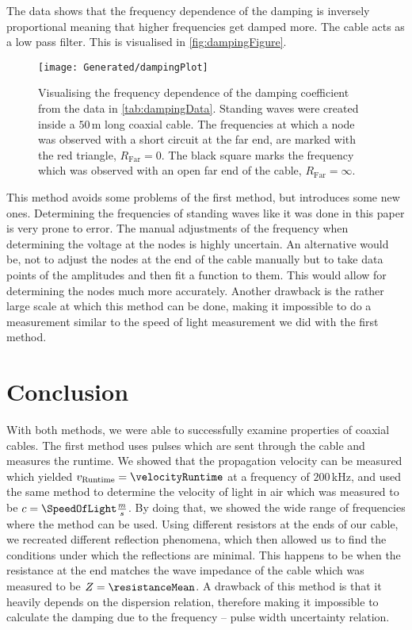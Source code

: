 \documentclass[a4paper,10pt,twocolumn]{article}
\begin{document}
    The data shows that the frequency dependence of the damping is inversely proportional meaning that higher frequencies get damped more.
    The cable acts as a low pass filter.
    This is visualised in \autoref{fig:dampingFigure}.
    \begin{figure}
    \begin{center}
        \texttt{[image: Generated/dampingPlot]}
        \caption[]{Visualising the frequency dependence of the damping coefficient from the data in \autoref{tab:dampingData}.
        Standing waves were created inside a $50\,$m long coaxial cable.
        The frequencies at which a node was observed with a short circuit at the far end, are marked with the red triangle, $R_{\text{Far}}=0$.
        The black square marks the frequency which was observed with an open far end of the cable, $R_{\text{Far}}=\infty$.}   %
        \label{fig:dampingFigure}
    \end{center}
    \end{figure}

    This method avoids some problems of the first method, but introduces some new ones.
    Determining the frequencies of standing waves like it was done in this paper is very prone to error.
    The manual adjustments of the frequency when determining the voltage at the nodes is highly uncertain. 
    An alternative would be, not to adjust the nodes at the end of the cable manually but to take data points of the amplitudes and then fit a function to them.
    This would allow for determining the nodes much more accurately.
    Another drawback is the rather large scale at which this method can be done, making it impossible to do a measurement similar to the speed of light measurement we did with the first method.
    
    \section{Conclusion}\label{sec:Conclusion}
    With both methods, we were able to successfully examine properties of coaxial cables.
    The first method uses pulses which are sent through the cable and measures the runtime.
    We showed that the propagation velocity can be measured which yielded $v_{\text{Runtime}}=\velocityRuntime$ at a frequency of $200\,$kHz,
    and used the same method to determine the velocity of light in air which was measured to be $c=\SpeedOfLight \frac{m}{s}$.
    By doing that, we showed the wide range of frequencies where the method can be used.
    Using different resistors at the ends of our cable, we recreated different reflection phenomena, which then allowed us to 
    find the conditions under which the reflections are minimal.
    This happens to be when the resistance at the end matches the wave impedance of the cable which was measured to be $Z= \resistanceMean $.
    A drawback of this method is that it heavily depends on the dispersion relation, therefore making it impossible to calculate the damping due to the
    frequency -- pulse width uncertainty relation.
    
\end{document}
